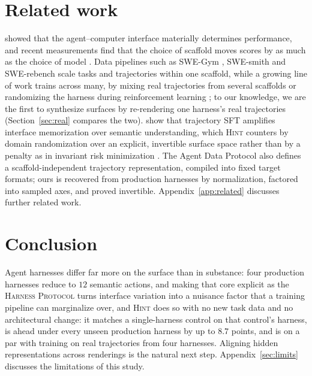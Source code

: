 \documentclass{article} %
\newcommand{\HP}{\textsc{Harness Protocol}}
\newcommand{\method}{\textsc{Hint}}
\begin{document}
\section{Related work}
\label{sec:related}

\citet{yang2024sweagent} showed that the agent--computer interface materially
determines performance, and recent measurements find that the
choice of scaffold moves scores by as much as the choice of model
\citep{zhang2026stopcomparing,yao2026harnessbench,zheng2026clawswebench}.
Data pipelines such as SWE-Gym \citep{pan2024swegym}, SWE-smith
\citep{yang2025swesmith} and SWE-rebench \citep{badertdinov2026swerebenchv2}
scale tasks and trajectories within one scaffold, while a growing line of
work trains across many, by mixing real trajectories from several scaffolds
\citep{abadji2026laguna} or randomizing the harness during reinforcement
learning \citep{huang2026katcoder,xu2026polar}; to our knowledge, we are the first to synthesize surfaces by re-rendering
one harness's real trajectories (Section~\ref{sec:real} compares the two).
\citet{gu2026interfaces} show that trajectory SFT amplifies interface
memorization over semantic understanding, which \method{} counters by domain
randomization \citep{tobin2017domain} over an explicit, invertible surface
space rather than by a penalty as in invariant risk minimization
\citep{arjovsky2019irm}. The Agent Data Protocol \citep{song2025adp} also
defines a scaffold-independent trajectory representation, compiled into fixed
target formats; ours is recovered from production harnesses by
normalization, factored into sampled axes, and proved invertible.
Appendix~\ref{app:related} discusses further related work.

\section{Conclusion}

Agent harnesses differ far more on the surface than in substance: four
production harnesses reduce to $12$ semantic actions, and making that core
explicit as the \HP{} turns interface variation into a nuisance factor that a training
pipeline can marginalize over, and \method{} does so with no new task data
and no architectural change: it matches a single-harness control on that
control's harness, is ahead under every
unseen production harness by up to $8.7$ points, and is on a par with
training on real trajectories from four harnesses. Aligning hidden
representations across renderings is the natural next step.
Appendix~\ref{sec:limits} discusses the limitations of this study.
\end{document}
